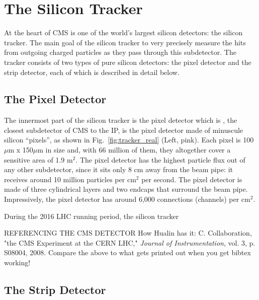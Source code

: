 \section{The Silicon Tracker}
\label{sec:tracker}

At the heart of CMS is one of the world's largest silicon detectors: the silicon tracker.
The main goal of the silicon tracker to very precisely measure the hits from outgoing charged particles as they pass through this subdetector.
The tracker consists of two types of pure silicon detectors: the pixel detector and the strip detector, each of which is described in detail below.

\subsection{The Pixel Detector}
\label{subsec:pixel}

The innermost part of the silicon tracker is the pixel detector which is , the closest subdetector of CMS to the IP, is the pixel detector made of minuscule silicon ``pixels'', as shown in Fig.~\ref{fig:tracker_real} (Left, pink).
Each pixel is 100$\mu$m x 150$\mu$m in size and, with 66 million of them, they altogether cover a sensitive area of 1.9 m$^2$. 
The pixel detector has the highest particle flux out of any other subdetector, since it sits only 8 cm away from the beam pipe:
it receives around 10 million particles per cm$^2$ per second.
The pixel detector is made of three cylindrical layers and two endcaps that surround the beam pipe.
Impressively, the pixel detector has around 6,000 connections (channels) per cm$^2$.

During the 2016 LHC running period, the silicon tracker 


REFERENCING THE CMS DETECTOR
How Hualin has it:
C. Collaboration, "the CMS Experiment at the CERN LHC," \textit{Journal of Instrumentation}, vol. 3, p. S08004, 2008.
Compare the above to what gets printed out when you get bibtex working!

\subsection{The Strip Detector}
\label{subsec:strip}

